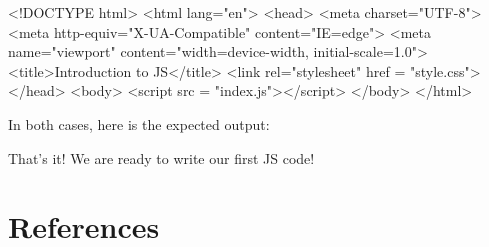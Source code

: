 \documentclass[
  letterpaper,
  DIV=11,
  numbers=noendperiod]{scrreprt}
\newenvironment{Shaded}{\begin{snugshade}}{\end{snugshade}}
\newcommand{\DataTypeTok}[1]{\textcolor[rgb]{0.68,0.00,0.00}{#1}}
\newcommand{\ErrorTok}[1]{\textcolor[rgb]{0.68,0.00,0.00}{#1}}
\newcommand{\KeywordTok}[1]{\textcolor[rgb]{0.00,0.23,0.31}{#1}}
\newcommand{\NormalTok}[1]{\textcolor[rgb]{0.00,0.23,0.31}{#1}}
\newcommand{\OtherTok}[1]{\textcolor[rgb]{0.00,0.23,0.31}{#1}}
\newcommand{\StringTok}[1]{\textcolor[rgb]{0.13,0.47,0.30}{#1}}
\newlength{\cslhangindent}
\newlength{\cslentryspacingunit} %
\newenvironment{CSLReferences}[2] %
 {%
  \setlength{\parindent}{0pt}
  \ifodd #1
  \let\oldpar\par
  \def\par{\hangindent=\cslhangindent\oldpar}
  \fi
  \setlength{\parskip}{#2\cslentryspacingunit}
 }%
 {}
\begin{document}
\begin{Shaded}
\begin{Highlighting}[]
\DataTypeTok{\textless{}!DOCTYPE }\NormalTok{html}\DataTypeTok{\textgreater{}}
\KeywordTok{\textless{}html} \ErrorTok{lang}\OtherTok{=}\StringTok{"en"}\KeywordTok{\textgreater{}}
\KeywordTok{\textless{}head\textgreater{}}
    \KeywordTok{\textless{}meta} \ErrorTok{charset}\OtherTok{=}\StringTok{"UTF{-}8"}\KeywordTok{\textgreater{}}
    \KeywordTok{\textless{}meta} \ErrorTok{http{-}equiv}\OtherTok{=}\StringTok{"X{-}UA{-}Compatible"} \ErrorTok{content}\OtherTok{=}\StringTok{"IE=edge"}\KeywordTok{\textgreater{}}
    \KeywordTok{\textless{}meta} \ErrorTok{name}\OtherTok{=}\StringTok{"viewport"} \ErrorTok{content}\OtherTok{=}\StringTok{"width=device{-}width, initial{-}scale=1.0"}\KeywordTok{\textgreater{}}
    \KeywordTok{\textless{}title\textgreater{}}\NormalTok{Introduction to JS}\KeywordTok{\textless{}/title\textgreater{}}
    \KeywordTok{\textless{}link} \ErrorTok{rel}\OtherTok{=}\StringTok{"stylesheet"} \ErrorTok{href} \OtherTok{=} \StringTok{"style.css"}\KeywordTok{\textgreater{}}
\KeywordTok{\textless{}/head\textgreater{}}
\KeywordTok{\textless{}body\textgreater{}}
    \KeywordTok{\textless{}script} \ErrorTok{src} \OtherTok{=} \StringTok{"index.js"}\KeywordTok{\textgreater{}\textless{}/script\textgreater{}}
\KeywordTok{\textless{}/body\textgreater{}}
\KeywordTok{\textless{}/html\textgreater{}}
\end{Highlighting}
\end{Shaded}

In both cases, here is the expected output:

That's it! We are ready to write our first JS code!


\hypertarget{references}{%
\chapter*{References}\label{references}}


\hypertarget{refs}{}
\begin{CSLReferences}{0}{0}
\end{CSLReferences}
\end{document}

